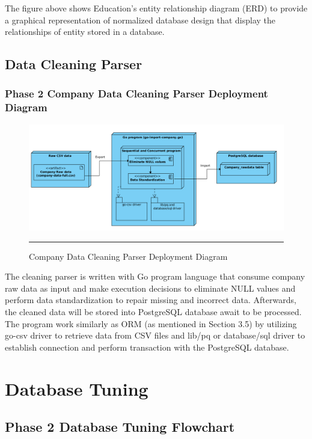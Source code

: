 The figure above shows Education's entity relationship diagram (ERD) to provide a graphical representation of normalized database design that display the relationships of entity stored in a database.

\subsection{Data Cleaning Parser}

\subsubsection{Phase 2 Company Data Cleaning Parser Deployment Diagram}

\begin{figure}[H]
	\centering
	\includegraphics[width=1.0\textwidth]{FYP2/Chapter3/FYP2-data-cleaning-deployment.png}
	\rule{35em}{0.5pt}
	\caption[Company Data Cleaning Parser Deployment Diagram]{Company Data Cleaning Parser Deployment Diagram}
\end{figure} 

The cleaning parser is written with Go program language that consume company raw data as input and make execution decisions to eliminate NULL values and perform data standardization to repair missing and incorrect data. Afterwards, the cleaned data will be stored into PostgreSQL database await to be processed. The program work similarly as ORM (as mentioned in Section 3.5) by utilizing go-csv driver to retrieve data from CSV files and lib/pq or database/sql driver to establish connection and perform transaction with the PostgreSQL database. 

\section{Database Tuning}

\subsection{Phase 2 Database Tuning Flowchart}

